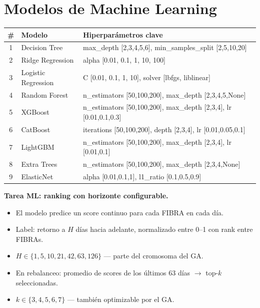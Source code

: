 \documentclass[12pt,letterpaper]{article}
\begin{document}
\section{Modelos de Machine Learning}

\begin{center}
\begin{tabular}{clp{8cm}}
\toprule
\textbf{\#} & \textbf{Modelo} & \textbf{Hiperparámetros clave} \\
\midrule
1 & Decision Tree         & max\_depth [2,3,4,5,6], min\_samples\_split [2,5,10,20] \\
2 & Ridge Regression      & alpha [0.01, 0.1, 1, 10, 100] \\
3 & Logistic Regression   & C [0.01, 0.1, 1, 10], solver [lbfgs, liblinear] \\
4 & Random Forest         & n\_estimators [50,100,200], max\_depth [2,3,4,5,None] \\
5 & XGBoost               & n\_estimators [50,100,200], max\_depth [2,3,4], lr [0.01,0.1,0.3] \\
6 & CatBoost              & iterations [50,100,200], depth [2,3,4], lr [0.01,0.05,0.1] \\
7 & LightGBM              & n\_estimators [50,100,200], max\_depth [2,3,4], lr [0.01,0.1] \\
8 & Extra Trees           & n\_estimators [50,100,200], max\_depth [2,3,4,None] \\
9 & ElasticNet            & alpha [0.01,0.1,1], l1\_ratio [0.1,0.5,0.9] \\
\bottomrule
\end{tabular}
\end{center}

\medskip

\textbf{Tarea ML: ranking con horizonte configurable.}
\begin{itemize}[leftmargin=2em]
  \item El modelo predice un score continuo para cada FIBRA en cada día.
  \item Label: retorno a $H$ días hacia adelante, normalizado entre 0--1 con rank entre FIBRAs.
  \item $H \in \{1, 5, 10, 21, 42, 63, 126\}$ — parte del cromosoma del GA.
  \item En rebalanceo: promedio de scores de los últimos 63 días $\to$ top-$k$ seleccionadas.
  \item $k \in \{3, 4, 5, 6, 7\}$ — también optimizable por el GA.
\end{itemize}
\end{document}

